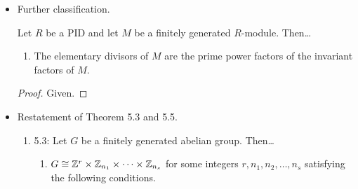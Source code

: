 \documentclass[../notes.tex]{subfiles}
\begin{document}
\begin{itemize}
\begin{lemma}
\begin{enumerate}[ref={\thelemma(\arabic*)}]
        \end{enumerate}
        \begin{proof}
            Given.
        \end{proof}
    \end{lemma}
    \begin{theorem}\label{trm:12.9}
        Let $R$ be a PID.
        \begin{enumerate}[ref={\thetheorem(\arabic*)}]
            \item \label{lem:12.9.1}Two finitely generated $R$-modules $M_1$ and $M_2$ are isomorphic iff they have the same free rank and the same list of invariant factors.
            \item \label{lem:12.9.2}Two finitely generated $R$-modules $M_1$ and $M_2$ are isomorphic iff they have the same free rank and the same list of elementary divisors.
        \end{enumerate}
        \begin{proof}
            Given.
        \end{proof}
    \end{theorem}
    \item Further classification.
    \begin{corollary}\label{cly:12.10}
        Let $R$ be a PID and let $M$ be a finitely generated $R$-module. Then\dots
        \begin{enumerate}
            \item The elementary divisors of $M$ are the prime power factors of the invariant factors of $M$.
        \end{enumerate}
        \begin{proof}
            Given.
        \end{proof}
    \end{corollary}
    \item Restatement of Theorem 5.3 and 5.5.
    \begin{corollary}\label{cly:12.11}\leavevmode
        \begin{enumerate}
            \item 5.3: Let $G$ be a finitely generated abelian group. Then\dots
            \begin{enumerate}
                \item $G\cong\mathbb{Z}^r\times\mathbb{Z}_{n_1}\times\cdots\times\mathbb{Z}_{n_s}$ for some integers $r,n_1,n_2,\dots,n_s$ satisfying the following conditions.
                \begin{enumerate}[label={(\roman*)}]

\end{enumerate}
\end{enumerate}
\end{enumerate}
\end{corollary}
\end{itemize}
\end{document}
